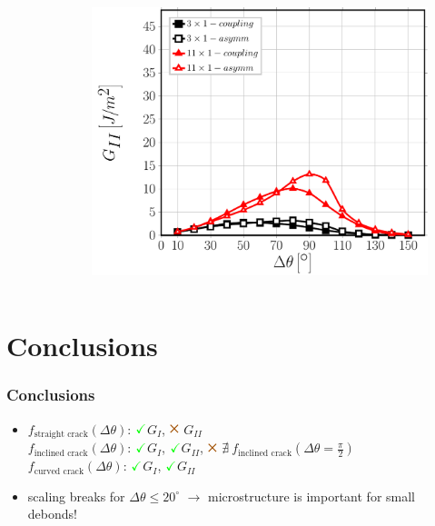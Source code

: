 \documentclass[first,firstsupp,lastsupp,last,hyperref,table]{ETHclass}
\newcommand{\Cross}{$\mathbin{\tikz [x=1.4ex,y=1.4ex,line width=.2ex, red] \draw (0,0) -- (1,1) (0,1) -- (1,0);}$}%
\newcommand{\Checkmark}{$\color{green}\mathbf{\checkmark}$}
\begin{document}
\begin{frame}
\begin{columns}[c]
\begin{column}{0.5\textwidth}
\begin{figure}
\end{figure}
\end{column}
\begin{column}{0.5\textwidth}
\centering
\begin{figure}
\centering
\includegraphics[width=\columnwidth]{nx1-coupling-vf60-GII-strainmagn11.pdf}
\end{figure}
\end{column}
\end{columns}
\end{frame}

\section{Conclusions}

\begin{frame}
\frametitle{Conclusions}
\vspace{-0.5cm}
\centering
\begin{itemize}[label=]
\item $f_{\text{straight crack}}\left(\Delta\theta\right)$: \Checkmark $G_{I}$, \textcolor{red}{\Cross} $G_{II}$\\[10pt]
$f_{\text{inclined crack}}\left(\Delta\theta\right)$: \Checkmark $G_{I}$, \Checkmark $G_{II}$, \textcolor{red}{\Cross} $\nexists\ f_{\text{inclined crack}}\left(\Delta\theta=\frac{\pi}{2}\right)$\\[10pt]
$f_{\text{curved crack}}\left(\Delta\theta\right)$: \Checkmark $G_{I}$, \Checkmark $G_{II}$\\[20pt]
\item scaling breaks for $\Delta\theta\leq20^{\circ}$ $\rightarrow$ microstructure is important for small debonds!
\end{itemize}
\end{frame}

\begin{frame}[plain]
\frametitle{}
\end{frame}
\end{document}

